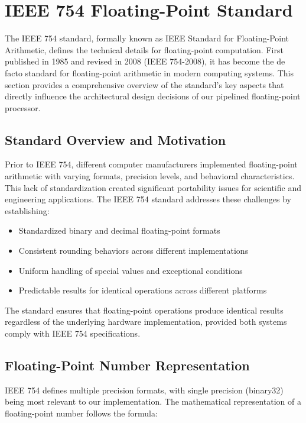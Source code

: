 \section{IEEE 754 Floating-Point Standard}
\label{sec:ieee754_standard}

The IEEE 754 standard, formally known as IEEE Standard for Floating-Point Arithmetic, defines the technical details for floating-point computation. First published in 1985 and revised in 2008 (IEEE 754-2008), it has become the de facto standard for floating-point arithmetic in modern computing systems. This section provides a comprehensive overview of the standard's key aspects that directly influence the architectural design decisions of our pipelined floating-point processor.

\subsection{Standard Overview and Motivation}
\label{subsec:ieee754_overview}

Prior to IEEE 754, different computer manufacturers implemented floating-point arithmetic with varying formats, precision levels, and behavioral characteristics. This lack of standardization created significant portability issues for scientific and engineering applications. The IEEE 754 standard addresses these challenges by establishing:

\begin{itemize}
\item Standardized binary and decimal floating-point formats
\item Consistent rounding behaviors across different implementations
\item Uniform handling of special values and exceptional conditions
\item Predictable results for identical operations across different platforms
\end{itemize}

The standard ensures that floating-point operations produce identical results regardless of the underlying hardware implementation, provided both systems comply with IEEE 754 specifications.

\subsection{Floating-Point Number Representation}
\label{subsec:ieee754_representation}

IEEE 754 defines multiple precision formats, with single precision (binary32) being most relevant to our implementation. The mathematical representation of a floating-point number follows the formula:

